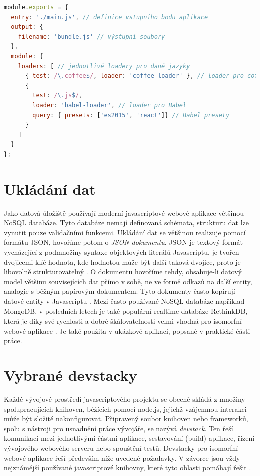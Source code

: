 \pagebreak
\begin{lstlisting}[language=Javascript,caption={Ukázka konfigurace module bundleru Webpack}]
module.exports = {
  entry: './main.js', // definice vstupního bodu aplikace
  output: {
    filename: 'bundle.js' // výstupní soubory
  },
  module: { 
    loaders: [ // jednotlivé loadery pro dané jazyky
      { test: /\.coffee$/, loader: 'coffee-loader' }, // loader pro coffeescript
      {
        test: /\.js$/,
        loader: 'babel-loader', // loader pro Babel
        query: { presets: ['es2015', 'react']} // Babel presety
      }
    ]
  }
};
\end{lstlisting}

\section{Ukládání dat}
Jako datová úložiště používají moderní javascriptové webové aplikace většinou NoSQL databáze. Tyto databáze nemají definovaná schémata, strukturu dat lze vynutit pouze validačními funkcemi. Ukládání dat se většinou realizuje pomocí formátu JSON, hovoříme potom o \textit{JSON dokumentu}. JSON je textový formát vycházející z podmnožiny syntaxe objektových literálů Javascriptu, je tvořen dvojicemi klíč-hodnota, kde hodnotou může být další taková dvojice, proto je libovolně strukturovatelný \cite{json}. O dokumentu hovoříme tehdy, obsahuje-li datový model  většinu souvisejících dat přímo v sobě, ne ve formě odkazů na další entity, analogie s běžným papírovým dokumentem. Tyto dokumenty často kopírují datové entity v Javascriptu \cite{ja}. Mezi často používané NoSQL databáze například MongoDB, v posledních letech je také populární realtime databáze RethinkDB, která je díky své rychlosti a dobré škálovatelnosti velmi vhodná pro isomorfní webové aplikace \cite{rethinkdb}. Je také použita v ukázkové aplikaci, popsané v praktické části práce.

\section{Vybrané devstacky}
\label{sec:devstacks}
Každé vývojové prostředí javascriptového projektu se obecně skládá z množiny spolupracujících knihoven, běžících pomocí node.js, jejichž vzájemnou interakci může být složité nakonfigurovat. Připravený soubor knihoven nebo frameworků, spolu s nástroji pro usnadnění práce vývojáře, se nazývá \textit{devstack}. Ten řeší komunikaci mezi jednotlivými částmi aplikace, sestavování (build) aplikace, řízení vývojového webového serveru nebo spouštění testů. Devstacky pro isomorfní webové aplikace řeší především níže uvedené požadavky. V závorce jsou vždy nejznámější používané javascriptové knihovny, které tyto oblasti pomáhají řešit \cite{isomorphic_pimentel}.

